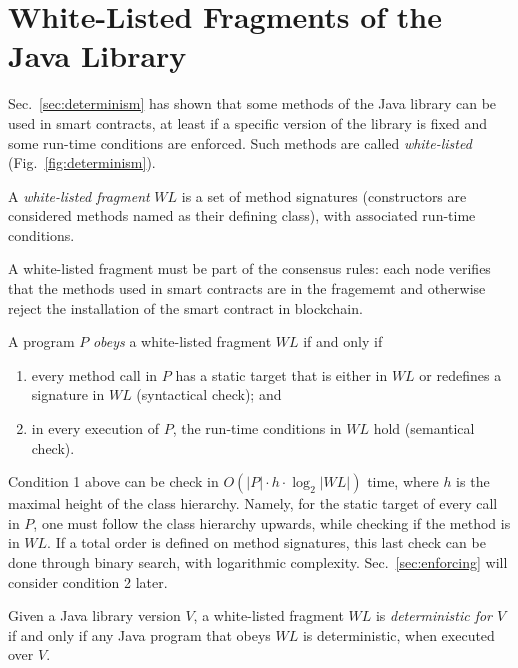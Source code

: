 \section{White-Listed Fragments of the Java Library}\label{sec:white_listing}

\newcommand{\wl}{\mathit{WL}}

Sec.~\ref{sec:determinism} has shown that some methods of the Java library can be used
in smart contracts, at least if a specific version of the library is fixed and some
run-time conditions are enforced. Such methods are called \emph{white-listed}
(Fig.~\ref{fig:determinism}).

\begin{definition}\label{def:white-listing}
  A \emph{white-listed fragment} $\wl$ is a set of method signatures (constructors are considered
  methods named as their defining class), with associated run-time conditions.
\end{definition}
%
A white-listed fragment must be part of the
consensus rules: each node verifies that the methods used in smart contracts are
in the fragememt and otherwise reject the installation of the smart contract
in blockchain.
%
\begin{definition}\label{def:obeys}
  A program $P$ \emph{obeys} a white-listed fragment $\wl$ if and only if
  \begin{enumerate}
    \item every method call
      in $P$ has a static target that is either in $\wl$ or redefines a signature in $\wl$
      (syntactical check); and
    \item in every execution of $P$, the run-time conditions in $\wl$ hold (semantical check).
  \end{enumerate}
\end{definition}
%
Condition 1 above can be check
in $O(|P|\cdot h\cdot\log_2|\wl|)$ time, where $h$ is the maximal height of the class
hierarchy. Namely, for the static target of every call in $P$,
one must follow the class hierarchy upwards, while checking if the method is in $\wl$. If a total
order is defined on method signatures, this last check can be done through binary search,
with logarithmic complexity. Sec.~\ref{sec:enforcing} will consider condition 2 later.
%
\begin{definition}\label{def:deterministic}
  Given a Java library version $V$, a white-listed fragment $\wl$ is
  \emph{deterministic for $V$}
  if and only if any Java program that obeys $\wl$
  is deterministic, when executed over $V$.
\end{definition}

